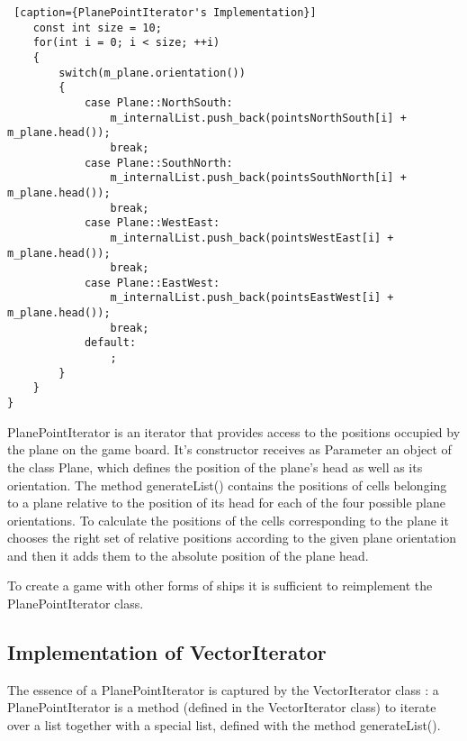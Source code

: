 \begin{lstlisting} [caption={PlanePointIterator's Implementation}]
    const int size = 10;
    for(int i = 0; i < size; ++i)
    {
        switch(m_plane.orientation())
        {
            case Plane::NorthSouth:
                m_internalList.push_back(pointsNorthSouth[i] + m_plane.head());
                break;
            case Plane::SouthNorth:
                m_internalList.push_back(pointsSouthNorth[i] + m_plane.head());
                break;
            case Plane::WestEast:
                m_internalList.push_back(pointsWestEast[i] + m_plane.head());
                break;
            case Plane::EastWest:
                m_internalList.push_back(pointsEastWest[i] + m_plane.head());
                break;
            default:
                ;
        }
    }
}
\end{lstlisting}

PlanePointIterator is an iterator that provides access to the positions occupied by the plane on the game board. It's constructor receives as Parameter an object of the class Plane, which defines the position of the plane's head as well as its orientation. The method generateList() contains the positions of cells belonging to a plane relative to the position of its head for each of the four possible plane orientations. To calculate the positions of the cells corresponding to the plane it chooses the right set of relative positions according to the given plane orientation and then it adds them to the absolute position of the plane head.

To create a game with other forms of ships it is sufficient to reimplement the PlanePointIterator class.

\subsection {Implementation of VectorIterator} \label {VectItImpl}

The essence of a PlanePointIterator is captured by the VectorIterator class : a PlanePointIterator is a method (defined in the VectorIterator class) to iterate over a list together with a special list, defined with the method generateList().

